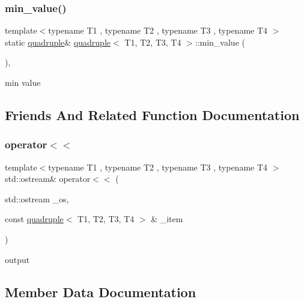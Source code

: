 \subsubsection{\texorpdfstring{min\+\_\+value()}{min\_value()}}
{\footnotesize\ttfamily template$<$typename T1 , typename T2 , typename T3 , typename T4 $>$ \\
static \hyperlink{structquadruple}{quadruple}\& \hyperlink{structquadruple}{quadruple}$<$ T1, T2, T3, T4 $>$\+::min\+\_\+value (\begin{DoxyParamCaption}{ }\end{DoxyParamCaption})\hspace{0.3cm}{\ttfamily [inline]}, {\ttfamily [static]}}



min value 



\subsection{Friends And Related Function Documentation}
\mbox{\label{structquadruple_af619be80f82068b7b05a8d943196f024}} 
\subsubsection{\texorpdfstring{operator$<$$<$}{operator<<}}
{\footnotesize\ttfamily template$<$typename T1 , typename T2 , typename T3 , typename T4 $>$ \\
std\+::ostream\& operator$<$$<$ (\begin{DoxyParamCaption}\item[{std\+::ostream}]{\+\_\+os,  }\item[{const \hyperlink{structquadruple}{quadruple}$<$ T1, T2, T3, T4 $>$ \&}]{\+\_\+item }\end{DoxyParamCaption})\hspace{0.3cm}{\ttfamily [friend]}}



output 



\subsection{Member Data Documentation}
\mbox{\label{structquadruple_a45642eeda831800cd5c540037822ac65}} 
